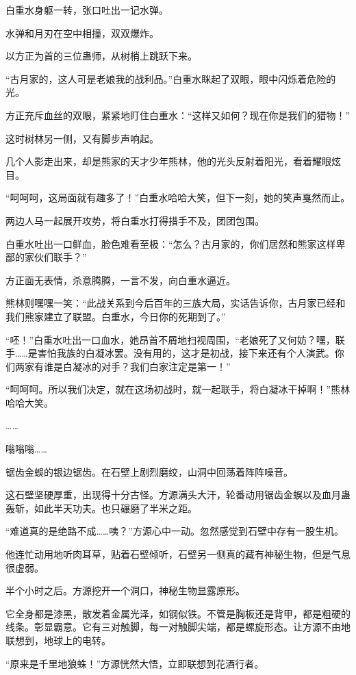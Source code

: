 \begin{this_body}
白重水身躯一转，张口吐出一记水弹。

水弹和月刃在空中相撞，双双爆炸。

以方正为首的三位蛊师，从树梢上跳跃下来。

“古月家的，这人可是老娘我的战利品。”白重水眯起了双眼，眼中闪烁着危险的光。

方正充斥血丝的双眼，紧紧地盯住白重水：“这样又如何？现在你是我们的猎物！”

这时树林另一侧，又有脚步声响起。

几个人影走出来，却是熊家的天才少年熊林，他的光头反射着阳光，看着耀眼炫目。

“呵呵呵，这局面就有趣多了！”白重水哈哈大笑，但下一刻，她的笑声戛然而止。

两边人马一起展开攻势，将白重水打得措手不及，团团包围。

白重水吐出一口鲜血，脸色难看至极：“怎么？古月家的，你们居然和熊家这样卑鄙的家伙们联手？”

方正面无表情，杀意腾腾，一言不发，向白重水逼近。

熊林则嘿嘿一笑：“此战关系到今后百年的三族大局，实话告诉你，古月家已经和我们熊家建立了联盟。白重水，今日你的死期到了。”

“呸！”白重水吐出一口血水，她昂首不屑地扫视周围，“老娘死了又何妨？嘿，联手……是害怕我族的白凝冰罢。没有用的，这才是初战，接下来还有个人演武。你们两家有谁是白凝冰的对手？我们白家注定是第一！”

“呵呵呵。所以我们决定，就在这场初战时，就一起联手，将白凝冰干掉啊！”熊林哈哈大笑。

……

嗡嗡嗡……

锯齿金蜈的银边锯齿。在石壁上剧烈磨绞，山洞中回荡着阵阵噪音。

这石壁坚硬厚重，出现得十分古怪。方源满头大汗，轮番动用锯齿金蜈以及血月蛊轰斩，如此半天功夫。也只碾磨了半米之距。

“难道真的是绝路不成……咦？”方源心中一动。忽然感觉到石壁中存有一股生机。

他连忙动用地听肉耳草，贴着石壁倾听，石壁另一侧真的藏有神秘生物，但是气息很虚弱。

半个小时之后。方源挖开一个洞口，神秘生物显露原形。

它全身都是漆黑，散发着金属光泽，如钢似铁。不管是胸板还是背甲，都是粗硬的线条。彰显霸意。它有三对触脚，每一对触脚尖端，都是螺旋形态。让方源不由地联想到，地球上的电转。

“原来是千里地狼蛛！”方源恍然大悟，立即联想到花酒行者。


\end{this_body}
